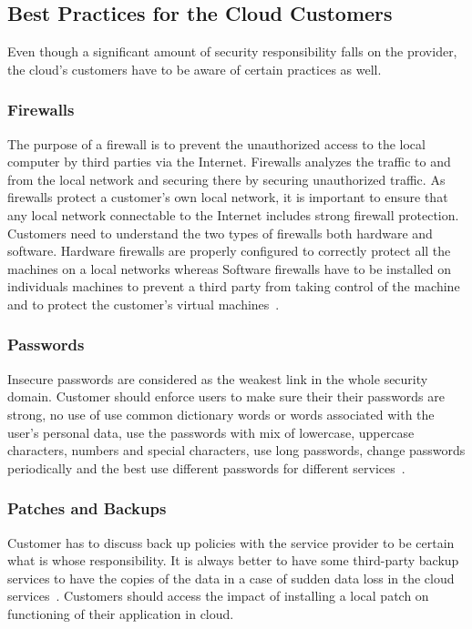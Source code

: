 \subsection{Best Practices for the Cloud Customers}
Even though a significant amount of security responsibility falls on the 
provider, the cloud's customers have to be aware of certain practices as well.

\subsubsection{Firewalls}
The purpose of a firewall is to prevent the unauthorized access to the local 
computer by third parties via the Internet. Firewalls analyzes the traffic to 
and from the local network and securing there by securing unauthorized traffic.
As firewalls protect a customer's own local network, it is important to ensure
that any local network connectable to the Internet includes strong firewall 
protection. Customers need to understand the two types of firewalls both 
hardware and software. Hardware firewalls are properly configured to 
correctly protect all the machines on a local networks whereas Software 
firewalls have to be installed on individuals machines to prevent a third 
party from taking control of the machine and to protect the customer's 
virtual machines~\cite{hid-sp18-513-diversity}.

\subsubsection{Passwords}
Insecure passwords are considered as the weakest link in the whole
security domain. Customer should enforce users to make sure their 
their passwords are strong, no use of use common dictionary words 
or words associated with the user's personal data, use the passwords
with mix of lowercase, uppercase characters, numbers and special 
characters, use long passwords, change passwords periodically 
and the best use different passwords for different services~\cite{hid-sp18-513-redpaper}.

\subsubsection{Patches and Backups}
Customer has to discuss back up policies with the service provider to be 
certain what is whose responsibility. It is always better to have some 
third-party backup services to have the copies of the data in a case 
of sudden data loss in the cloud services~\cite{hid-sp18-513-diversity}.
Customers should access the impact of installing a local patch on
functioning of their application in cloud.

